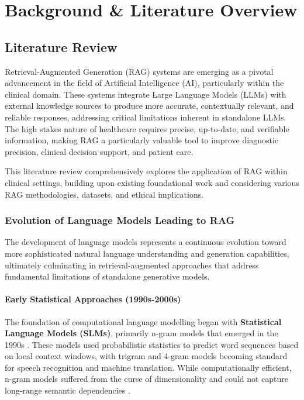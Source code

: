 \chapter{Background \& Literature Overview}
\section{Literature Review}

Retrieval-Augmented Generation (RAG) systems are emerging as a pivotal advancement in the field of Artificial Intelligence (AI), particularly within the clinical domain. These systems integrate Large Language Models (LLMs) with external knowledge sources to produce more accurate, contextually relevant, and reliable responses, addressing critical limitations inherent in standalone LLMs. The high stakes nature of healthcare requires precise, up-to-date, and verifiable information, making RAG a particularly valuable tool to improve diagnostic precision, clinical decision support, and patient care.

This literature review comprehensively explores the application of RAG within clinical settings, building upon existing foundational work and considering various RAG methodologies, datasets, and ethical implications.

\subsection{Evolution of Language Models Leading to RAG}

The development of language models represents a continuous evolution toward more sophisticated natural language understanding and generation capabilities, ultimately culminating in retrieval-augmented approaches that address fundamental limitations of standalone generative models.

\subsubsection{Early Statistical Approaches (1990s-2000s)}
The foundation of computational language modelling began with \textbf{Statistical Language Models (SLMs)}, primarily n-gram models that emerged in the 1990s \citep{kneser1995improved}. These models used probabilistic statistics to predict word sequences based on local context windows, with trigram and 4-gram models becoming standard for speech recognition and machine translation. While computationally efficient, n-gram models suffered from the curse of dimensionality and could not capture long-range semantic dependencies \citep{bengio2003neural}.

